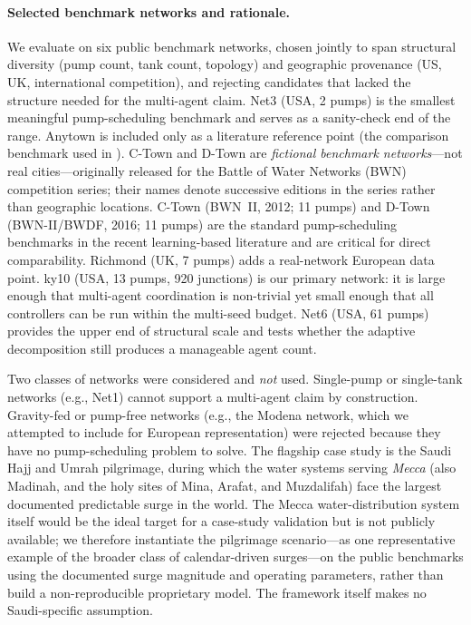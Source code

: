 \documentclass[11pt,a4paper]{article}
\begin{document}
\paragraph{Selected benchmark networks and rationale.} We evaluate on six public
benchmark networks, chosen jointly to span structural diversity (pump count,
tank count, topology) and geographic provenance (US, UK, international
competition), and rejecting candidates that lacked the structure needed for the
multi-agent claim. Net3 (USA, 2 pumps) is the smallest meaningful pump-scheduling
benchmark and serves as a sanity-check end of the range. Anytown is included only
as a literature reference point (the comparison benchmark used in
\citet{Pei2025RTPump}). C-Town and D-Town are \emph{fictional benchmark
networks}---not real cities---originally released for the Battle of Water
Networks (BWN) competition series; their names denote successive editions in the
series rather than geographic locations. C-Town (BWN~II, 2012; 11 pumps) and
D-Town (BWN-II/BWDF, 2016; 11 pumps) are the standard pump-scheduling benchmarks
in the recent learning-based literature \citep{Pei2025RTPump} and are critical
for direct comparability. Richmond (UK, 7 pumps) adds a real-network European
data point. ky10 (USA, 13 pumps, 920 junctions) is our primary network: it is
large enough that multi-agent coordination is non-trivial yet small enough that
all controllers can be run within the multi-seed budget. Net6 (USA, 61 pumps)
provides the upper end of structural scale and tests whether the adaptive
decomposition still produces a manageable agent count.

Two classes of networks were considered and \emph{not} used. Single-pump or
single-tank networks (e.g., Net1) cannot support a multi-agent claim by
construction. Gravity-fed or pump-free networks (e.g., the Modena network, which
we attempted to include for European representation) were rejected because they
have no pump-scheduling problem to solve. The flagship case study is the Saudi
Hajj and Umrah pilgrimage, during which the water systems serving \emph{Mecca}
(also Madinah, and the holy sites of Mina, Arafat, and Muzdalifah) face the
largest documented predictable surge in the world. The Mecca water-distribution
system itself would be the ideal target for a case-study validation but is not
publicly available; we therefore instantiate the pilgrimage scenario---as one
representative example of the broader class of calendar-driven surges---on the
public benchmarks using the documented surge magnitude and operating parameters,
rather than build a non-reproducible proprietary model. The framework itself
makes no Saudi-specific assumption.
\end{document}
